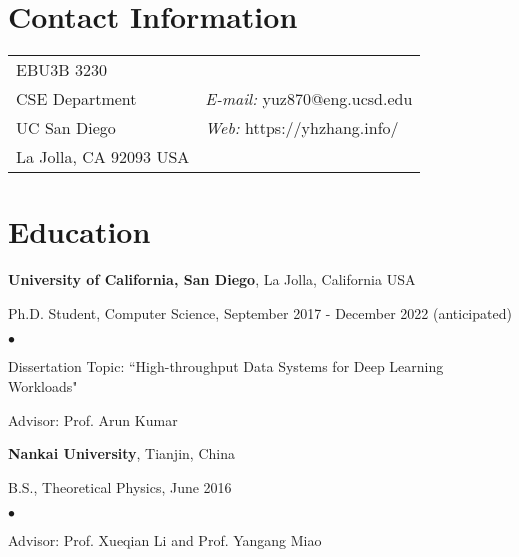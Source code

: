 \documentclass[margin,line]{res}
\newenvironment{list1}{
 \begin{list}{\ding{113}}{%
   \setlength{\itemsep}{0in}
   \setlength{\parsep}{0in} \setlength{\parskip}{0in}
   \setlength{\topsep}{0in} \setlength{\partopsep}{0in} 
   \setlength{\leftmargin}{0.17in}}}{\end{list}}
\newenvironment{list2}{
 \begin{list}{$\bullet$}{%
   \setlength{\itemsep}{0in}
   \setlength{\parsep}{0in} \setlength{\parskip}{0in}
   \setlength{\topsep}{0in} \setlength{\partopsep}{0in} 
   \setlength{\leftmargin}{0.2in}}}{\end{list}}
\begin{document}
\sloppy


\begin{resume}
\section{\sc Contact Information}
\vspace{.05in}
\begin{tabular}{@{}p{2in}p{4in}}
EBU3B 3230       &  \\       
CSE Department  & {\it E-mail:} yuz870@eng.ucsd.edu\\
UC San Diego & {\it Web:} https://yhzhang.info/ \\    
La Jolla, CA 92093 USA & \\   
\end{tabular}

\section{\sc Education}
{\bf University of California, San Diego}, La Jolla, California USA\\
\vspace*{-.1in}
\begin{list1}
\item[] Ph.D. Student, Computer Science, September 2017 - December 2022 (anticipated)
\begin{list2}
\vspace*{.05in}
\item Dissertation Topic: ``High-throughput Data Systems for Deep Learning Workloads"
\item Advisor: Prof. Arun Kumar
\end{list2}
\end{list1}

{\bf Nankai University}, Tianjin, China\\
\vspace*{-.1in}
\begin{list1}
\item[] B.S., Theoretical Physics, June 2016
\begin{list2}
\item Advisor: Prof. Xueqian Li and Prof. Yangang Miao
\end{list2}
\end{list1}



\end{resume}
\end{document}

